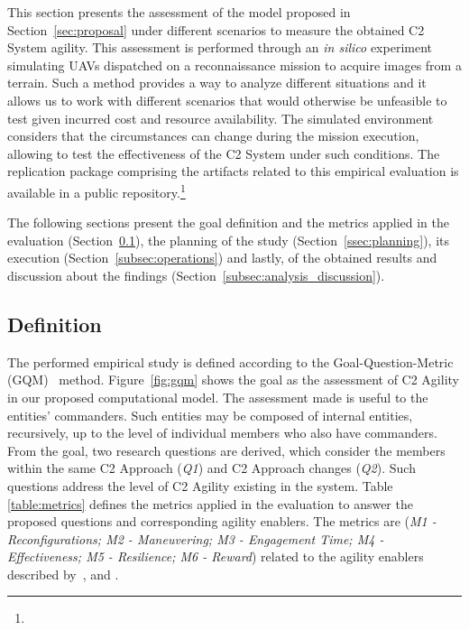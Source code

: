 This section presents the assessment of the model proposed in Section~\ref{sec:proposal} under different scenarios to measure the obtained C2 System agility. This assessment is performed through an \textit{in silico} experiment~\citep{simulation01} simulating UAVs dispatched on a reconnaissance mission to acquire images from a terrain. Such a method provides a way to analyze different situations and it allows us to work with different scenarios that would otherwise be unfeasible to test given incurred cost and resource availability. The simulated environment considers that the circumstances can change during the mission execution, allowing to test the effectiveness of the C2 System under such conditions. The replication package comprising the artifacts related to this empirical evaluation is available in a public repository.\footnote{\reproductibility}

The following sections present the goal definition and the metrics applied in the evaluation  (Section~\ref{ssec:definition}), the planning of the study  (Section~\ref{ssec:planning}), its execution (Section~\ref{subsec:operations}) and lastly,  of the obtained results and discussion about the findings  (Section~\ref{subsec:analysis_discussion}). 


 
\subsection{Definition}
\label{ssec:definition}

The performed empirical study is defined according to the Goal-Question-Metric (GQM)~\citep{gqm001} method. Figure~\ref{fig:gqm} shows the goal as the assessment of C2 Agility in our proposed computational model. The assessment made is useful to the entities' commanders. Such entities may be composed of internal entities, recursively, up to the level of individual members who also have commanders. From the goal, two research questions are derived, which consider the members within the same C2 Approach  (\textit{Q1}) and C2 Approach changes  (\textit{Q2}). Such questions address the level of C2 Agility existing in the system. Table \ref{table:metrics} defines the metrics applied in the evaluation to answer the proposed questions and corresponding agility enablers. The metrics are (\textit{M1 - Reconfigurations; M2 - Maneuvering; M3 - Engagement Time; M4 - Effectiveness; M5 - Resilience; M6 - Reward}) related to the agility enablers described by~\citet{Gren2019AgilityIR}, \citet{c2-02} and \citet{Alberts2011}.  


